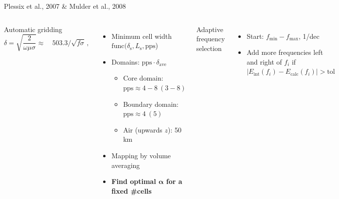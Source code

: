 \documentclass[xcolor=svgnames, aspectratio=169]{beamer}
\begin{document}
  \begin{frame}
    {Plessix et al., 2007 \& Mulder et al., 2008}
    \begin{columns}[t]
      \alert{Automatic gridding}
      \begin{equation}
        \delta = \sqrt{\frac{2}{\omega\mu\sigma}} \approx
        \quad 503.3/\sqrt{f\sigma} \, ,
        \nonumber
      \end{equation}
      \begin{itemize}
        \item Minimum cell width
          $\mathrm{func}(\delta_\mathrm{s}, L_\mathrm{s}, \mathrm{pps}$)
        \item Domains:
          $\mathrm{pps}\cdot\delta_\mathrm{ave}$
          \begin{itemize}
            \item Core domain: $\mathrm{pps}\approx 4-8\ (3-8)$
            \item Boundary domain: $\mathrm{pps}\approx 4\ (5)$
            \item Air (upwards $z$): 50\,km
          \end{itemize}
        \item Mapping by volume averaging
        \item \textbf{Find optimal $\boldsymbol{\alpha}$ for a fixed \#cells}
      \end{itemize}
      \alert{Adaptive frequency selection}
      \begin{itemize}
        \item Start: $f_\mathrm{min}-f_\mathrm{max}$, 1/dec
        \item Add more frequencies left and right of $f_i$ if
          $|E_\mathrm{int}(f_i)-E_\mathrm{calc}(f_i)|>\mathrm{tol}$
      \end{itemize}
      \vspace{1em}
      \centering
      \includegraphics[width=.8\textwidth]{mulder08fig1}
    \end{columns}
  \end{frame}
\end{document}
